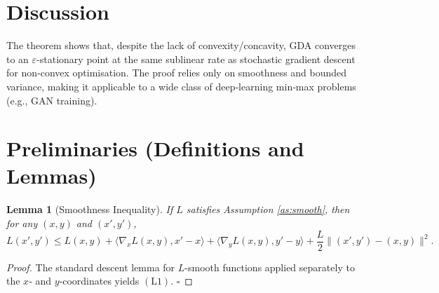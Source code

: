 \documentclass{article}
\newtheorem{lemma}{Lemma}
\begin{document}
\section*{Discussion}
The theorem shows that, despite the lack of convexity/concavity, GDA converges to an \(\varepsilon\)-stationary point at the same sublinear rate as stochastic gradient descent for non‑convex optimisation. The proof relies only on smoothness and bounded variance, making it applicable to a wide class of deep‑learning min‑max problems (e.g., GAN training).

\newpage
\section*{Preliminaries (Definitions and Lemmas)}
\begin{lemma}[Smoothness Inequality]\label{lem:smooth}
If \(L\) satisfies Assumption \ref{as:smooth}, then for any \((x,y)\) and \((x',y')\),
\[
L(x',y') \le L(x,y)
      +\langle\nabla_{x}L(x,y),x'-x\rangle
      +\langle\nabla_{y}L(x,y),y'-y\rangle
      +\frac{L}{2}\big\|(x',y')-(x,y)\big\|^{2}.
\tag{L1}
\]
\end{lemma}
\begin{proof}
The standard descent lemma for \(L\)-smooth functions applied separately to the \(x\)‑ and \(y\)‑coordinates yields \((\text{L1})\). \(\square\)
\end{proof}
\end{document}
